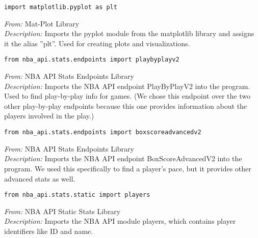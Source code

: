 \documentclass{article}
\begin{document}
\begin{lstlisting}
import matplotlib.pyplot as plt
\end{lstlisting}
\textit{From:} Mat-Plot Library\\
\textit{Description:} Imports the pyplot module from the matplotlib library and assigns it the alias ”plt”. Used for creating plots and visualizations.

\begin{lstlisting}
from nba_api.stats.endpoints import playbyplayv2
\end{lstlisting}
\textit{From:} NBA API Stats Endpoints Library\\
\textit{Description:} Imports the NBA API endpoint PlayByPlayV2 into the program. Used to find play-by-play info for games. (We chose this endpoint over the two other play-by-play endpoints because this one provides information about the players involved in the play.)

\begin{lstlisting}
from nba_api.stats.endpoints import boxscoreadvancedv2
\end{lstlisting}
\textit{From:} NBA API Stats Endpoints Library\\
\textit{Description:} Imports the NBA API endpoint BoxScoreAdvancedV2 into the program. We used this specifically to find a player's pace, but it provides other advanced stats as well.

\begin{lstlisting}
from nba_api.stats.static import players
\end{lstlisting}
\textit{From:} NBA API Static Stats Library\\
\textit{Description:} Imports the NBA API module players, which contains player identifiers like ID and name.
\end{document}
